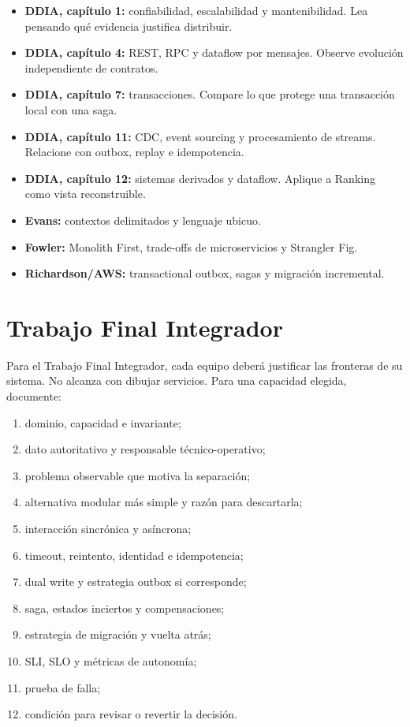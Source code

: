 \documentclass[variant=apuntes,cover=institutional,mode=screen]{ua-engineering-v6-article}
\begin{document}
\begin{itemize}
\item \textbf{DDIA, capítulo 1:} confiabilidad, escalabilidad y mantenibilidad. Lea pensando qué evidencia justifica distribuir.
\item \textbf{DDIA, capítulo 4:} REST, RPC y dataflow por mensajes. Observe evolución independiente de contratos.
\item \textbf{DDIA, capítulo 7:} transacciones. Compare lo que protege una transacción local con una saga.
\item \textbf{DDIA, capítulo 11:} CDC, event sourcing y procesamiento de streams. Relacione con outbox, replay e idempotencia.
\item \textbf{DDIA, capítulo 12:} sistemas derivados y dataflow. Aplique a Ranking como vista reconstruible.
\item \textbf{Evans:} contextos delimitados y lenguaje ubicuo.
\item \textbf{Fowler:} Monolith First, trade-offs de microservicios y Strangler Fig.
\item \textbf{Richardson/AWS:} transactional outbox, sagas y migración incremental.
\end{itemize}

\section{Trabajo Final Integrador}

Para el Trabajo Final Integrador, cada equipo deberá justificar las fronteras de su sistema. No alcanza con dibujar servicios. Para una capacidad elegida, documente:

\begin{enumerate}
\item dominio, capacidad e invariante;
\item dato autoritativo y responsable técnico-operativo;
\item problema observable que motiva la separación;
\item alternativa modular más simple y razón para descartarla;
\item interacción sincrónica y asíncrona;
\item timeout, reintento, identidad e idempotencia;
\item dual write y estrategia outbox si corresponde;
\item saga, estados inciertos y compensaciones;
\item estrategia de migración y vuelta atrás;
\item SLI, SLO y métricas de autonomía;
\item prueba de falla;
\item condición para revisar o revertir la decisión.
\end{enumerate}
\end{document}
